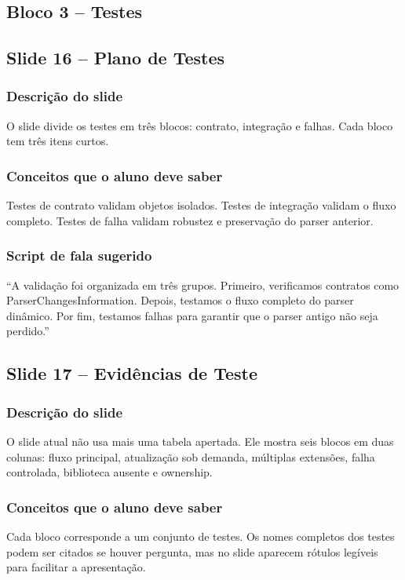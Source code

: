 \documentclass[12pt,a4paper]{article}
\newcommand{\slide}[2]{\subsection{Slide #1 -- #2}}
\begin{document}
\subsection*{Bloco 3 -- Testes}

\slide{16}{Plano de Testes}

\subsubsection*{Descri\c{c}\~ao do slide}

O slide divide os testes em tr\^es blocos: contrato, integra\c{c}\~ao e falhas. Cada bloco tem tr\^es itens curtos.

\subsubsection*{Conceitos que o aluno deve saber}

Testes de contrato validam objetos isolados. Testes de integra\c{c}\~ao validam o fluxo completo. Testes de falha validam robustez e preserva\c{c}\~ao do parser anterior.

\subsubsection*{Script de fala sugerido}

``A valida\c{c}\~ao foi organizada em tr\^es grupos. Primeiro, verificamos contratos como ParserChangesInformation. Depois, testamos o fluxo completo do parser din\^amico. Por fim, testamos falhas para garantir que o parser antigo n\~ao seja perdido.''

\slide{17}{Evid\^encias de Teste}

\subsubsection*{Descri\c{c}\~ao do slide}

O slide atual n\~ao usa mais uma tabela apertada. Ele mostra seis blocos em duas colunas: fluxo principal, atualiza\c{c}\~ao sob demanda, m\'ultiplas extens\~oes, falha controlada, biblioteca ausente e ownership.

\subsubsection*{Conceitos que o aluno deve saber}

Cada bloco corresponde a um conjunto de testes. Os nomes completos dos testes podem ser citados se houver pergunta, mas no slide aparecem r\'otulos leg\'iveis para facilitar a apresenta\c{c}\~ao.
\end{document}
